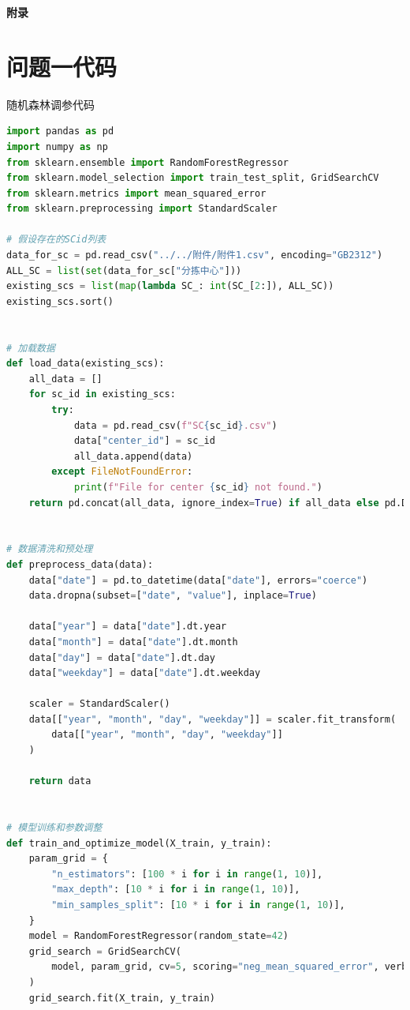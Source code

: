 \documentclass[UTF8]{article}%
\begin{document}
\clearpage







\clearpage
\begin{center}
    \huge \bf 附录
\end{center}
\appendix
\section{问题一代码}
\noindent 随机森林调参代码
\begin{lstlisting}[language=python]
import pandas as pd
import numpy as np
from sklearn.ensemble import RandomForestRegressor
from sklearn.model_selection import train_test_split, GridSearchCV
from sklearn.metrics import mean_squared_error
from sklearn.preprocessing import StandardScaler

# 假设存在的SCid列表
data_for_sc = pd.read_csv("../../附件/附件1.csv", encoding="GB2312")
ALL_SC = list(set(data_for_sc["分拣中心"]))
existing_scs = list(map(lambda SC_: int(SC_[2:]), ALL_SC))
existing_scs.sort()


# 加载数据
def load_data(existing_scs):
    all_data = []
    for sc_id in existing_scs:
        try:
            data = pd.read_csv(f"SC{sc_id}.csv")
            data["center_id"] = sc_id
            all_data.append(data)
        except FileNotFoundError:
            print(f"File for center {sc_id} not found.")
    return pd.concat(all_data, ignore_index=True) if all_data else pd.DataFrame()


# 数据清洗和预处理
def preprocess_data(data):
    data["date"] = pd.to_datetime(data["date"], errors="coerce")
    data.dropna(subset=["date", "value"], inplace=True)

    data["year"] = data["date"].dt.year
    data["month"] = data["date"].dt.month
    data["day"] = data["date"].dt.day
    data["weekday"] = data["date"].dt.weekday

    scaler = StandardScaler()
    data[["year", "month", "day", "weekday"]] = scaler.fit_transform(
        data[["year", "month", "day", "weekday"]]
    )

    return data


# 模型训练和参数调整
def train_and_optimize_model(X_train, y_train):
    param_grid = {
        "n_estimators": [100 * i for i in range(1, 10)],
        "max_depth": [10 * i for i in range(1, 10)],
        "min_samples_split": [10 * i for i in range(1, 10)],
    }
    model = RandomForestRegressor(random_state=42)
    grid_search = GridSearchCV(
        model, param_grid, cv=5, scoring="neg_mean_squared_error", verbose=2
    )
    grid_search.fit(X_train, y_train)


\end{lstlisting}
\end{document}
